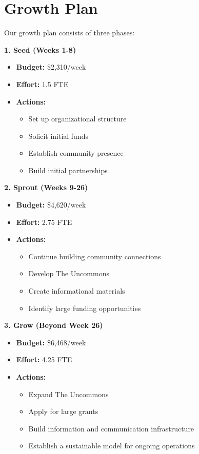 \documentclass[
  letterpaper,
  DIV=11,
  numbers=noendperiod]{scrreprt}
\providecommand{\tightlist}{%
  \setlength{\itemsep}{0pt}\setlength{\parskip}{0pt}}\usepackage{longtable,booktabs,array}
\begin{document}
\hypertarget{sec-aagu_growth_plan}{%
\section{Growth Plan}\label{sec-aagu_growth_plan}}

Our growth plan consists of three phases:

\textbf{1. Seed (Weeks 1-8)}

\begin{itemize}
\tightlist
\item
  \textbf{Budget:} \$2,310/week
\item
  \textbf{Effort:} 1.5 FTE
\item
  \textbf{Actions:}

  \begin{itemize}
  \tightlist
  \item
    Set up organizational structure
  \item
    Solicit initial funds
  \item
    Establish community presence
  \item
    Build initial partnerships
  \end{itemize}
\end{itemize}

\textbf{2. Sprout (Weeks 9-26)}

\begin{itemize}
\tightlist
\item
  \textbf{Budget:} \$4,620/week
\item
  \textbf{Effort:} 2.75 FTE
\item
  \textbf{Actions:}

  \begin{itemize}
  \tightlist
  \item
    Continue building community connections
  \item
    Develop The Uncommons
  \item
    Create informational materials
  \item
    Identify large funding opportunities
  \end{itemize}
\end{itemize}

\textbf{3. Grow (Beyond Week 26)}

\begin{itemize}
\tightlist
\item
  \textbf{Budget:} \$6,468/week
\item
  \textbf{Effort:} 4.25 FTE
\item
  \textbf{Actions:}

  \begin{itemize}
  \tightlist
  \item
    Expand The Uncommons
  \item
    Apply for large grants
  \item
    Build information and communication infrastructure
  \item
    Establish a sustainable model for ongoing operations
  \end{itemize}
\end{itemize}
\end{document}
